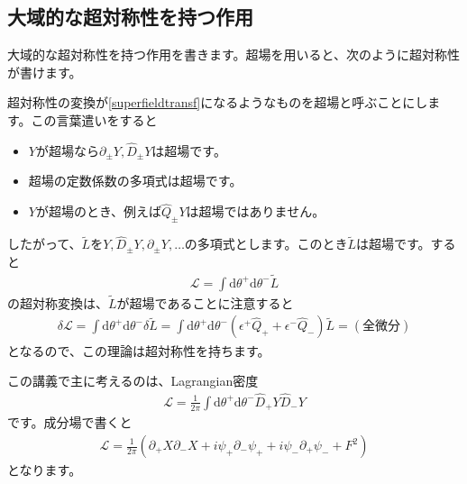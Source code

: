 \documentclass[report,paper=a4, fontsize=12pt, line_length=16cm, number_of_lines=34,dvipdfmx]{jlreq}
\numberwithin{equation}{chapter}
\numberwithin{equation}{section}
\newcommand{\del}{\partial}
\newcommand{\Lt}{\widetilde{L}}
\newcommand{\Lcal}{\mathcal{L}}
\newcommand{\di}{\mathrm{d}}
\newcommand{\Qd}{\widehat{Q}}
\newcommand{\Dd}{\widehat{D}}
\begin{document}
\subsection{大域的な超対称性を持つ作用}
大域的な超対称性を持つ作用を書きます。超場を用いると、次のように超対称性が書けます。

超対称性の変換が\eqref{superfieldtransf}になるようなものを超場と呼ぶことにします。この言葉遣いをすると
\begin{itemize}
  \item $Y$が超場なら$\del_{\pm}Y,\Dd_{\pm}Y$は超場です。
  \item 超場の定数係数の多項式は超場です。
  \item $Y$が超場のとき、例えば$\Qd_{\pm}Y$は超場ではありません。
\end{itemize}
したがって、$\Lt$を$Y,\Dd_{\pm}Y,\del_{\pm}Y,\dots$の多項式とします。このとき$\Lt$は超場です。すると
\begin{align}
  \Lcal=\int \di \theta^{+} \di \theta^{-} \Lt
\end{align}
の超対称変換は、$\Lt$が超場であることに注意すると
\begin{align}
  \delta \Lcal
  =\int \di \theta^{+} \di \theta^{-} \delta\Lt
  =\int \di \theta^{+} \di \theta^{-} (\epsilon^{+}\Qd_{+}+\epsilon^{-}\Qd_{-})\Lt
  =(\text{全微分})
\end{align}
となるので、この理論は超対称性を持ちます。

この講義で主に考えるのは、Lagrangian密度
\begin{align}
  \Lcal=\frac{1}{2\pi}\int \di \theta^{+} \di \theta^{-}\Dd_{+}Y\Dd_{-}Y
\end{align}
です。成分場で書くと
\begin{align}
  \Lcal=\frac{1}{2\pi}\left( 
    \del_{+}X\del_{-}X+i\psi_{+}\del_{-}\psi_{+}+i\psi_{-}\del_{+}\psi_{-}
    +F^2
   \right)\label{susylagrangian0}
\end{align}
となります。
\end{document}
